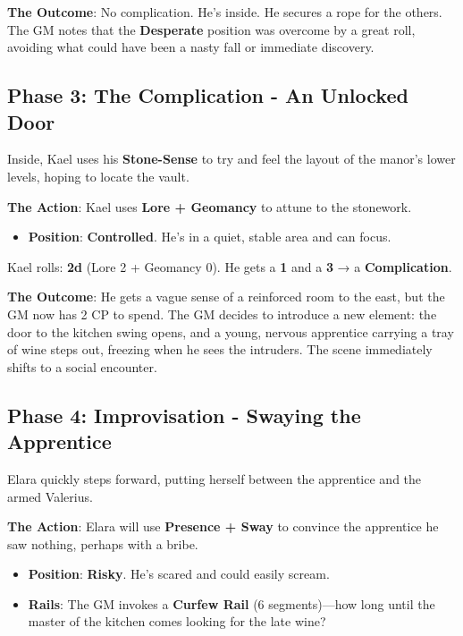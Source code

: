\textbf{The Outcome}: No complication. He's inside. He secures a rope for the others. The GM notes that the \textbf{Desperate} position was overcome by a great roll, avoiding what could have been a nasty fall or immediate discovery.

\subsection*{Phase 3: The Complication - An Unlocked Door}

Inside, Kael uses his \textbf{Stone-Sense} to try and feel the layout of the manor's lower levels, hoping to locate the vault.

\textbf{The Action}: Kael uses \textbf{Lore + Geomancy} to attune to the stonework.

\begin{itemize}
    \item \textbf{Position}: \textbf{Controlled}. He's in a quiet, stable area and can focus.
\end{itemize}

Kael rolls: \textbf{2d} (Lore 2 + Geomancy 0). He gets a \textbf{1} and a \textbf{3} → a \textbf{Complication}.

\textbf{The Outcome}: He gets a vague sense of a reinforced room to the east, but the GM now has 2 CP to spend. The GM decides to introduce a new element: the door to the kitchen swing opens, and a young, nervous apprentice carrying a tray of wine steps out, freezing when he sees the intruders. The scene immediately shifts to a social encounter.

\subsection*{Phase 4: Improvisation - Swaying the Apprentice}

Elara quickly steps forward, putting herself between the apprentice and the armed Valerius.

\textbf{The Action}: Elara will use \textbf{Presence + Sway} to convince the apprentice he saw nothing, perhaps with a bribe.

\begin{itemize}
    \item \textbf{Position}: \textbf{Risky}. He's scared and could easily scream.
    \item \textbf{Rails}: The GM invokes a \textbf{Curfew Rail} (6 segments)—how long until the master of the kitchen comes looking for the late wine?
\end{itemize}

